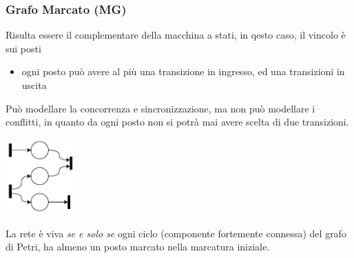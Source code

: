 \documentclass[10pt, letterpaper]{report}
\begin{document}
\subsubsection{Grafo Marcato (MG)}
Risulta essere il complementare della macchina a stati, in qesto caso, il vincolo è sui posti\begin{itemize}
    \item ogni posto può avere al più una transizione in ingresso, ed una transizioni in uscita 
\end{itemize}
Può modellare la concorrenza e sincronizzazione, ma non può modellare i conflitti, in quanto da ogni posto non si potrà mai avere scelta di due transizioni.
\begin{center}
    \includegraphics[width=0.2\textwidth]{images/PetriMG.drawio.pdf}
\end{center}
La rete è viva \textit{se e solo se} ogni ciclo (componente fortemente connessa) del grafo di Petri, ha almeno un posto marcato nella marcatura iniziale.
\end{document}
